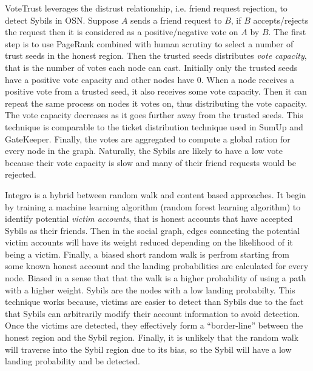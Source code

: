 VoteTrust\cite{xue2013votetrust} leverages the distrust relationship, i.e.
friend request rejection, to detect Sybils in OSN. Suppose $A$ sends a friend
request to $B$, if $B$ accepts/rejects the request then it is considered as a
positive/negative vote on $A$ by $B$. The first step is to use PageRank combined
with human scrutiny to select a number of trust seeds in the honest region. Then
the trusted seeds distributes \emph{vote capacity}, that is the number of votes
each node can cast. Initially only the trusted seeds have a positive vote
capacity and other nodes have 0. When a node receives a positive vote from a
trusted seed, it also receives some vote capacity. Then it can repeat the same
process on nodes it votes on, thus distributing the vote capacity. The vote
capacity decreases as it goes further away from the trusted seeds. This
technique is comparable to the ticket distribution technique used in SumUp and
GateKeeper. Finally, the votes are aggregated to compute a global ration for
every node in the graph. Naturally, the Sybils are likely to have a low vote
because their vote capacity is slow and many of their friend requests would be
rejected.

Integro\cite{boshmaf2015integro} is a hybrid between random walk and content based
approaches. It begin by training a machine learning algorithm (random forest
learning algorithm) to identify potential \emph{victim accounts}, that is honest
accounts that have accepted Sybils as their friends. Then in the social graph,
edges connecting the potential victim accounts will have its weight reduced
depending on the likelihood of it being a victim. Finally, a biased short random
walk is perfrom starting from some known honest account and the landing
probabilities are calculated for every node. Biased in a sense that that the
walk is a higher probability of using a path with a higher weight. Sybils are
the nodes with a low landing probabilty. This technique works because, victims
are easier to detect than Sybils due to the fact that Sybils can arbitrarily
modify their account information to avoid detection. Once the victims are
detected, they effectively form a ``border-line'' between the honest region and
the Sybil region. Finally, it is unlikely that the random walk will traverse
into the Sybil region due to its bias, so the Sybil will have a low landing
probability and be detected.


